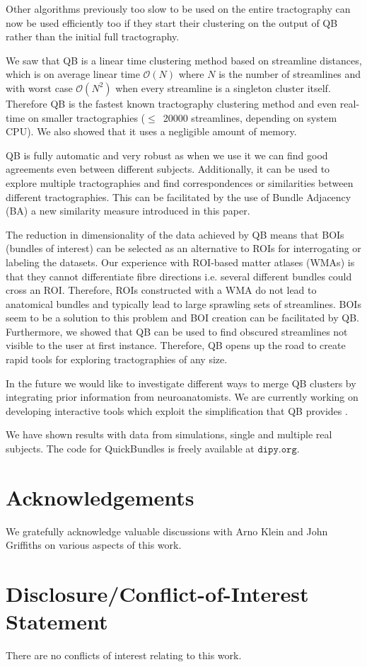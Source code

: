 \documentclass{bioinfo}
\begin{document}
Other algorithms previously too slow to be used on the entire
tractography can now be used efficiently too if they start their clustering
on the output of QB rather than the initial full tractography.

We saw that QB is a linear time clustering method based on streamline
distances, which is on average linear time $\mathcal{O}(N)$ where $N$ is
the number of streamlines and with worst case $\mathcal{O}(N^{2})$ when
every streamline is a singleton cluster itself. Therefore QB is the
fastest known tractography clustering method and even real-time on
smaller tractographies ($\le$~\num{20000} streamlines, depending on
system CPU). We also showed that it uses a negligible amount of memory.

QB is fully automatic and very robust as when we use it we can find good
agreements even between different subjects. Additionally, it can be used
to explore multiple tractographies and find correspondences or
similarities between different tractographies. This can be facilitated
by the use of Bundle Adjacency (BA) a new similarity measure introduced
in this paper.

The reduction in dimensionality of the data achieved by QB means that
BOIs (bundles of interest) can be selected as an alternative to ROIs for
interrogating or labeling the datasets.  Our experience with ROI-based
matter atlases (WMAs) is that they cannot differentiate fibre directions
i.e. several different bundles could cross an ROI. Therefore, ROIs
constructed with a WMA do not lead to anatomical bundles and typically
lead to large sprawling sets of streamlines. BOIs seem to be a solution
to this problem and BOI creation can be facilitated by QB. Furthermore,
we showed that QB can be used to find obscured streamlines not visible
to the user at first instance. Therefore, QB opens up the road to create
rapid tools for exploring tractographies of any size.

In the future we would like to investigate different ways to merge QB
clusters by integrating prior information from neuroanatomists. We are
currently working on developing interactive tools which exploit the
simplification that QB provides \citep[see][]{GaryfallidisHBM2012}.

We have shown results with data from simulations, single and multiple
real subjects. The code for QuickBundles is freely available at
$\texttt{dipy.org}$.

\section*{Acknowledgements}
We gratefully acknowledge valuable discussions with Arno Klein and John
Griffiths on various aspects of this work.

\section*{Disclosure/Conflict-of-Interest Statement}
There are no conflicts of interest relating to this work.

%

%
%
%
%

\end{document}
